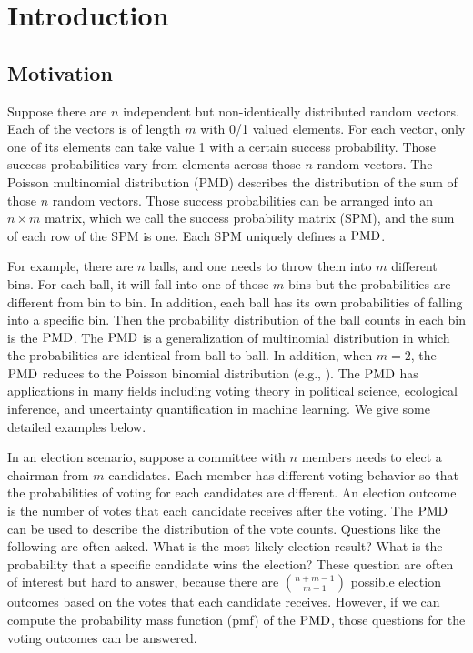\documentclass[12pt]{article}
\newcommand{\PMD}{{\normalfont\textrm{PMD}}}
\begin{document}
\newpage
\section{Introduction}
\subsection{Motivation}

Suppose there are $n$ independent but non-identically distributed random vectors. Each of the vectors is of length $m$ with 0/1 valued elements. For each vector, only one of its elements can take value 1 with a certain success probability. Those success probabilities vary from elements across those $n$ random vectors. The Poisson multinomial distribution (PMD) describes the distribution of the sum of those $n$ random vectors. Those success probabilities can be arranged into an $n \times m$ matrix, which we call the success probability matrix (SPM), and the sum of each row of the SPM is one. Each SPM uniquely defines a $\PMD$.

For example, there are $n$ balls, and one needs to throw them into $m$ different bins. For each ball, it will fall into one of those $m$ bins but the probabilities are different from bin to bin. In addition, each ball has its own probabilities of falling into a specific bin. Then the probability distribution of the ball counts in each bin is the $\PMD$. The $\PMD$ is a generalization of multinomial distribution in which the probabilities are identical from ball to ball. In addition, when $m=2$, the $\PMD$ reduces to the Poisson binomial distribution (e.g., ). The $\PMD$ has applications in many fields including voting theory in political science, ecological inference, and uncertainty quantification in machine learning. We give some detailed examples below.

In an election scenario, suppose a committee with $n$ members needs to elect a chairman from $m$ candidates. Each member has different voting behavior so that the probabilities of voting for each candidates are different. An election outcome is the number of votes that each candidate receives after the voting. The $\PMD$ can be used to describe the distribution of the vote counts. Questions like the following are often asked. What is the most likely election result? What is the probability that a specific candidate wins the election? These question are often of interest but hard to answer, because there are $\binom{n+m-1}{m-1}$ possible election outcomes based on the votes that each candidate receives. However, if we can compute the probability mass function (pmf) of the $\PMD$, those questions for the voting outcomes can be answered.
\end{document}
